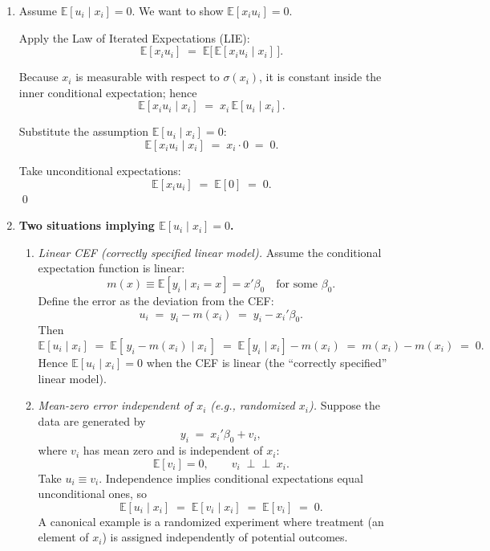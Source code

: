 \documentclass[12pt]{article}
\newcommand{\E}{\mathbb{E}}
\numberwithin{equation}{section}
\begin{document}
\begin{enumerate}[label=(\arabic*),leftmargin=1.3em]
    Assuming $\E[x_i x_i']$ is invertible, we obtain
    \[
    \beta^* = \E[x_i x_i']^{-1} \E[x_i y_i].
    \]

    \qed
  \item
    Assume $\E[u_i \mid x_i]=0$. We want to show $\E[x_i u_i]=0$.

    Apply the Law of Iterated Expectations (LIE):
    \[
      \E[x_i u_i] \;=\; \E\!\big[\,\E[x_i u_i \mid x_i]\,\big].
    \]

    Because $x_i$ is measurable with respect to $\sigma(x_i)$, it is constant inside the inner conditional expectation; hence
    \[
      \E[x_i u_i \mid x_i] \;=\; x_i\,\E[u_i \mid x_i].
    \]

    Substitute the assumption $\E[u_i \mid x_i]=0$:
    \[
      \E[x_i u_i \mid x_i] \;=\; x_i\cdot 0 \;=\; 0.
    \]

    Take unconditional expectations:
    \[
      \E[x_i u_i] \;=\; \E[0] \;=\; 0.
    \]
    \qed
  \item
    \textbf{Two situations implying $\E[u_i \mid x_i]=0$.}
    \begin{enumerate}[label=\roman*.,leftmargin=1.5em]
    \item \textit{Linear CEF (correctly specified linear model).}  
    Assume the conditional expectation function is linear:
    \[
      m(x) \equiv \E[y_i \mid x_i=x] = x'\beta_0 \quad \text{for some }\beta_0.
    \]
    Define the error as the deviation from the CEF:
    \[
      u_i \;=\; y_i - m(x_i) \;=\; y_i - x_i'\beta_0 .
    \]
    Then
    \[
      \E[u_i \mid x_i]
      \;=\; \E[\,y_i - m(x_i) \mid x_i\,]
      \;=\; \E[y_i \mid x_i] - m(x_i)
      \;=\; m(x_i) - m(x_i)
      \;=\; 0.
    \]
    Hence $\E[u_i \mid x_i]=0$ when the CEF is linear (the “correctly specified” linear model).

    \item \textit{Mean-zero error independent of $x_i$ (e.g., randomized $x_i$).}  
    Suppose the data are generated by
    \[
      y_i \;=\; x_i'\beta_0 + v_i,
    \]
    where $v_i$ has mean zero and is independent of $x_i$:
    \[
      \E[v_i]=0, \qquad v_i \;\perp\!\!\!\perp\; x_i.
    \]
    Take $u_i \equiv v_i$. Independence implies conditional expectations equal unconditional ones, so
    \[
      \E[u_i \mid x_i]
      \;=\; \E[v_i \mid x_i]
      \;=\; \E[v_i]
      \;=\; 0.
    \]
    A canonical example is a randomized experiment where treatment (an element of $x_i$) is assigned independently of potential outcomes.
  \end{enumerate}
\end{enumerate}
\end{document}
